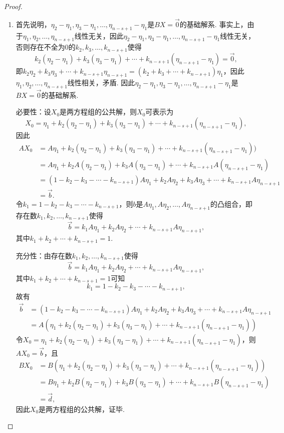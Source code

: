 \begin{proof}
\begin{enumerate}
        \item 首先说明，$\eta_2-\eta_1,\eta_3-\eta_1,\ldots,\eta_{n-s+1}-\eta_1$是$BX=\vec{0}$的基础解系. 事实上，由于$\eta_1,\eta_2,\ldots,\eta_{n-s+1}$线性无关，因此$\eta_2-\eta_1,\eta_3-\eta_1,\ldots,\eta_{n-s+1}-\eta_1$线性无关，否则存在不全为0的$k_2,k_3,\ldots,k_{n-s+1}$使得
              \[k_2(\eta_2-\eta_1)+k_3(\eta_3-\eta_1)+\cdots+k_{n-s+1}(\eta_{n-s+1}-\eta_1)=\vec{0},\]
              即$k_2\eta_2+k_3\eta_3+\cdots+k_{n-s+1}\eta_{n-s+1}=(k_2+k_3+\cdots+k_{n-s+1})\eta_1$，因此$\eta_1,\eta_2,\ldots,\eta_{n-s+1}$线性相关，矛盾. 因此$\eta_2-\eta_1,\eta_3-\eta_1,\ldots,\eta_{n-s+1}-\eta_1$是$BX=\vec{0}$的基础解系.

              必要性：设$X_0$是两方程组的公共解，则$X_0$可表示为
              \[X_0=\eta_1+k_2(\eta_2-\eta_1)+k_3(\eta_3-\eta_1)+\cdots+k_{n-s+1}(\eta_{n-s+1}-\eta_1),\]
              因此
              \begin{align*}
                  AX_0 & =A\eta_1+k_2(\eta_2-\eta_1)+k_3(\eta_3-\eta_1)+\cdots+k_{n-s+1}(\eta_{n-s+1}-\eta_1))    \\
                       & =A\eta_1+k_2A(\eta_2-\eta_1)+k_3A(\eta_3-\eta_1)+\cdots+k_{n-s+1}A(\eta_{n-s+1}-\eta_1)  \\
                       & =(1-k_2-k_3-\cdots-k_{n-s+1})A\eta_1+k_2A\eta_2+k_3A\eta_3+\cdots+k_{n-s+1}A\eta_{n-s+1} \\
                       & =\vec{b}.
              \end{align*}
              令$k_1=1-k_2-k_3-\cdots-k_{n-s+1}$，则$b$是$A\eta_1,A\eta_2,\ldots,A\eta_{n-s+1}$的凸组合，即存在数$k_1,k_2,\ldots,k_{n-s+1}$使得
              \[\vec{b}=k_1A\eta_1+k_2A\eta_2+\cdots+k_{n-s+1}A\eta_{n-s+1},\]
              其中$k_1+k_2+\cdots+k_{n-s+1}=1$.

              充分性：由存在数$k_1,k_2,\ldots,k_{n-s+1}$使得
              \[\vec{b}=k_1A\eta_1+k_2A\eta_2+\cdots+k_{n-s+1}A\eta_{n-s+1},\]
              其中$k_1+k_2+\cdots+k_{n-s+1}=1$可知
              \[k_1=1-k_2-k_3-\cdots-k_{n-s+1},\]
              故有
              \begin{align*}
                  \vec{b} & =(1-k_2-k_3-\cdots-k_{n-s+1})A\eta_1+k_2A\eta_2+k_3A\eta_3+\cdots+k_{n-s+1}A\eta_{n-s+1} \\
                          & =A(\eta_1+k_2(\eta_2-\eta_1)+k_3(\eta_3-\eta_1)+\cdots+k_{n-s+1}(\eta_{n-s+1}-\eta_1))
              \end{align*}
              令$X_0=\eta_1+k_2(\eta_2-\eta_1)+k_3(\eta_3-\eta_1)+\cdots+k_{n-s+1}(\eta_{n-s+1}-\eta_1)$，则$AX_0=\vec{b}$，且
              \begin{align*}
                  BX_0 & =B(\eta_1+k_2(\eta_2-\eta_1)+k_3(\eta_3-\eta_1)+\cdots+k_{n-s+1}(\eta_{n-s+1}-\eta_1))  \\
                       & =B\eta_1+k_2B(\eta_2-\eta_1)+k_3B(\eta_3-\eta_1)+\cdots+k_{n-s+1}B(\eta_{n-s+1}-\eta_1) \\
                       & =\vec{d},
              \end{align*}
              因此$X_0$是两方程组的公共解，证毕.


\end{enumerate}
\end{proof}
